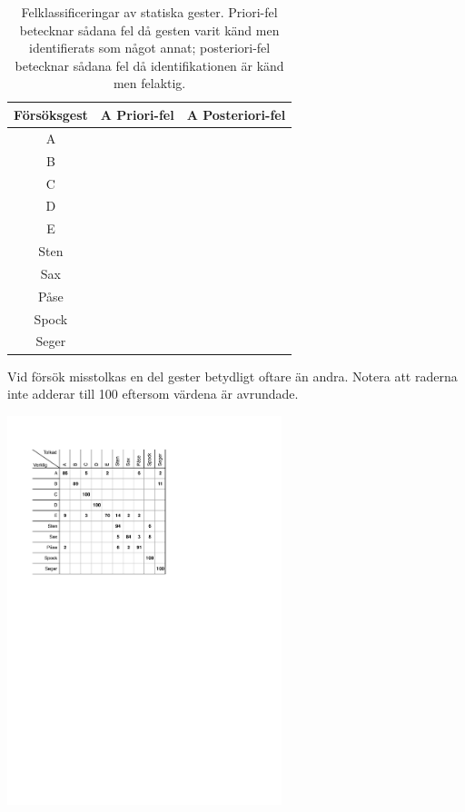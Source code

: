 \documentclass[../rapport_MVEX01-11-05]{subfiles}
\begin{document}
\begin{table}[tbp]
	\centering
	\caption{Felklassificeringar av statiska gester. Priori-fel
	betecknar sådana fel då gesten varit känd men identifierats
	som något annat; posteriori-fel betecknar sådana fel då
	identifikationen är känd men felaktig. }
	\smallskip
	\label{tab:prestanda}
	\begin{tabular}{c c c}
		\toprule 
		Försöksgest & A Priori-fel & A Posteriori-fel \\
		\midrule 
		A & & \\
		B & & \\
		C & & \\
		D & & \\
		E & & \\
		Sten & & \\
		Sax & & \\
		Påse & & \\
		Spock & & \\
		Seger & & \\
		\bottomrule 
	\end{tabular}
\end{table}

\begin{table}[tbp]
	  \centering
		\caption{Vid försök misstolkas en del gester betydligt oftare än
		andra. Notera att raderna inte adderar till 100 eftersom värdena är
		avrundade.}
		\label{tab:tolkningsmatris}
    \includegraphics[trim=2cm 16cm 8cm 2.5cm,clip=true,width=8cm]{bilder/tolkningsmatris.pdf}
\end{table}
\end{document}
